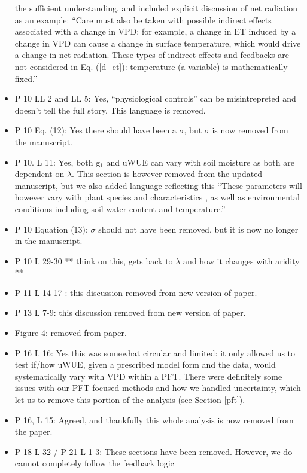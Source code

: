 \documentclass[12pt]{article}
\begin{document}
\begin{itemize}
  the sufficient understanding, and included explicit discussion of
  net radiation as an example: ``Care must also be taken with possible
  indirect effects associated with a change in VPD: for example, a
  change in ET induced by a change in VPD can cause a change in
  surface temperature, which would drive a change in net
  radiation. These types of indirect effects and feedbacks are not
  considered in Eq. (\ref{d_et}): temperature (a variable) is
  mathematically fixed.''
\item P 10 LL 2 and LL 5: Yes, ``physiological controls'' can be
  misintrepreted and doesn't tell the full story. This language is
  removed.
\item P 10 Eq. (12): Yes there should have been a $\sigma$, but
  $\sigma$ is now removed from the manuscript.
\item P 10. L 11: Yes, both g$_1$ and uWUE can vary with soil moisture
  as both are dependent on $\lambda$. This section is however removed
  from the updated manuscript, but we also added language reflecting
  this ``These parameters will however vary with plant species and
  characteristics \citep[e.g. wood density, ][]{Lin_2015}, as well as
  environmental conditions including soil water content
  \citep{Manzoni2013} and temperature.''
\item P 10 Equation (13): $\sigma$ should not have been removed, but
  it is now no longer in the manuscript.
\item P 10 L 29-30 ** think on this, gets back to $\lambda$ and how it
  changes with aridity **
\item P 11 L 14-17 : this discussion removed from new version of
  paper.
\item P 13 L 7-9: this discussion removed from new version of paper.
\item Figure 4: removed from paper.
\item P 16 L 16: Yes this was somewhat circular and limited: it only
  allowed us to test if/how uWUE, given a prescribed model form
  and the data, would systematically vary with VPD within a PFT. There
  were definitely some issues with our PFT-focused methods and how we
  handled uncertainty, which let us to remove this portion of the
  analysis (see Section \ref{pft}).
\item P 16, L 15: Agreed, and thankfully this whole analysis is now
  removed from the paper.
\item P 18 L 32 / P 21 L 1-3: These sections have been
  removed. However, we do cannot completely follow the feedback logic

\end{itemize}
\end{document}

